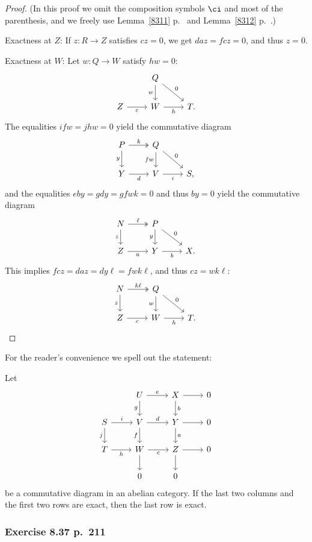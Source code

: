 \documentclass[12pt]{article}
\theoremstyle{remark}
\theoremstyle{definition}
\begin{document}
\begin{proof}
(In this proof we omit the composition symbols $\ci$ and most of the parenthesis, and we freely use Lemma~\ref{8311} p.~ and Lemma~\ref{8312} p.~.)

\nn Exactness at $Z$: If $z:R\to Z$ satisfies $cz=0$, we get $daz=fcz=0$, and thus $z=0$.

\nn Exactness at $W$: Let $w:Q\to W$ satisfy $hw=0$: 
$$
\begin{tikzcd}
&Q\ar[dr,"0"]\ar[d,"w"']\\ 
Z\ar[r,"c"']&W\ar[r,"h"']&T.
\end{tikzcd}
$$ 
The equalities $ifw=jhw=0$ yield the commutative diagram 
$$
\begin{tikzcd} 
P\ar[d,"y"']\ar[r,two heads,"k"]&Q\ar[d,"fw"']\ar[dr,"0"]\\ 
Y\ar[r,"d"']&V\ar[r,"i"']&S,
\end{tikzcd}
$$ 
and the equalities $eby=gdy=gfwk=0$ and thus $by=0$ yield the commutative diagram 
$$
\begin{tikzcd} 
N\ar[d,"z"']\ar[r,two heads,"\ell"]&P\ar[d,"y"']\ar[dr,"0"]\\ 
Z\ar[r,"a"']&Y\ar[r,"b"']&X.
\end{tikzcd}
$$ 
This implies $fcz=daz=dy\ell=fwk\ell$, and thus $cz=wk\ell$: 
$$
\begin{tikzcd}
N\ar[d,"z"']\ar[r,two heads,"k\ell"]&Q\ar[dr,"0"]\ar[d,"w"']\\ 
Z\ar[r,"c"']&W\ar[r,"h"']&T.
\end{tikzcd}
$$ 
\end{proof} 

For the reader's convenience we spell out the  statement: 

Let 
$$
\begin{tikzcd} 
&U\ar[d,"g"']\ar[r,"e"]&X\ar[d,"b"]\ar[r]&0\\ 
S\ar[d,"j"']\ar[r,"i"]&V\ar[d,"f"']\ar[r,"d"]&Y\ar[d,"a"]\ar[r]&0\\ 
T\ar[r,"h"']&W\ar[d]\ar[r,"c"']&Z\ar[d]\ar[r]&0\\ 
&0&0
\end{tikzcd}
$$ 
be a commutative diagram in an abelian category. If the last two columns and the first two rows are exact, then the last row is exact. 

\subsubsection{Exercise 8.37 p.~211}
\end{document}
